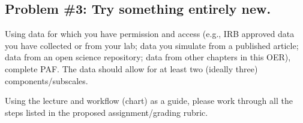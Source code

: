 \documentclass[
  english,
]{book}
\begin{document}
\hypertarget{problem-3-try-something-entirely-new.-4}{%
\subsection{Problem \#3: Try something entirely new.}\label{problem-3-try-something-entirely-new.-4}}

Using data for which you have permission and access (e.g., IRB approved data you have collected or from your lab; data you simulate from a published article; data from an open science repository; data from other chapters in this OER), complete PAF. The data should allow for at least two (ideally three) components/subscales.

Using the lecture and workflow (chart) as a guide, please work through all the steps listed in the proposed assignment/grading rubric.
\end{document}

